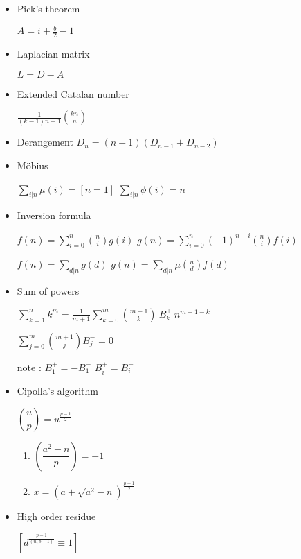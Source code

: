 \begin{itemize}

    \item Pick's theorem

    $A=i+\frac{b}{2}-1$

    \item Laplacian matrix

    $L = D - A$

    \item Extended Catalan number

    $\frac{1}{(k-1)n+1} {kn\choose n}$

    \item Derangement
    $D_n=(n-1)(D_{n-1}+D_{n-2})$

    \item Möbius

    $\sum\limits_{i|n} \mu(i)=[n=1]$
    $\sum\limits_{i|n} \phi(i)=n$

    \item Inversion formula

    $f(n)=\sum\limits_{i=0}^n{n \choose i}g(i)$
    $g(n)=\sum\limits_{i=0}^n(-1)^{n-i}{n \choose i}f(i)$

    $f(n)=\sum\limits_{d|n}g(d)$
    $g(n)=\sum\limits_{d|n}\mu(\frac{n}{d})f(d)$

    \item Sum of powers

    $\sum_{k=1}^{n} k^m=\frac{1}{m+1}\sum_{k=0}^{m}{{m+1}\choose{k}}~B^+_k~n^{m+1-k}$

    $\sum_{j=0}^{m}{m+1\choose j}B^-_j=0$

    note :
    $B^+_1=-B^-_1$
    $B^+_i=B^-_i$

    \item Cipolla's algorithm

    $\left(\dfrac{u}{p}\right)=u^{\frac{p-1}{2}}$

    \begin{enumerate}
        \item $\left(\dfrac{a^2-n}{p}\right)=-1$
        \item $x=(a+\sqrt{a^2-n})^{\frac{p+1}{2}}$
    \end{enumerate}

    \item High order residue

    $[d^{\frac{p-1}{(n,p-1)}}\equiv 1]$

\end{itemize}
